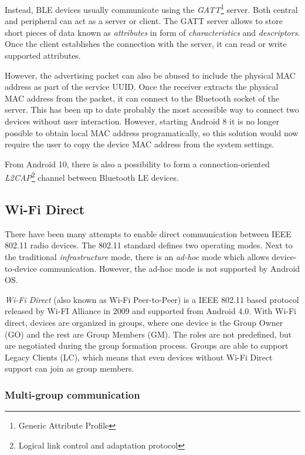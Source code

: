 \documentclass[conference,compsoc]{IEEEtran}
\begin{document}
Instead, BLE devices usually communicate using the \textit{GATT}\footnote{Generic Attribute Profile} server. Both central and peripheral can act as a server or client. The GATT server allows to store short pieces of data known as \textit{attributes} in form of \textit{characteristics} and \textit{descriptors}. Once the client establishes the connection with the server, it can read or write supported attributes.

However, the advertising packet can also be abused to include the physical MAC address as part of the service UUID. Once the receiver extracts the physical MAC address from the packet, it can connect to the Bluetooth socket of the server. This has been up to date probably the most accessible way to connect two devices without user interaction. However, starting Android 8 it is no longer possible to obtain local MAC address programatically, so this solution would now require the user to copy the device MAC address from the system settings.

From Android 10, there is also a possibility to form a connection-oriented \textit{L2CAP}\footnote{Logical link control and adaptation protocol} channel between Bluetooth LE devices.

\subsection{Wi-Fi Direct}

There have been many attempts to enable direct communication between IEEE 802.11 radio devices. The 802.11 standard defines two operating modes. Next to the traditional \textit{infrastructure} mode, there is an \textit{ad-hoc} mode which allows device-to-device communication. However, the ad-hoc mode is not supported by Android OS.

\textit{Wi-Fi Direct} (also known as Wi-Fi Peer-to-Peer) \cite{wifip2p} is a IEEE 802.11 based protocol released by Wi-FI Alliance in 2009 and supported from Android 4.0. With Wi-Fi direct, devices are organized in groups, where one device is the Group Owner (GO) and the rest are Group Members (GM). The roles are not predefined, but are negotiated during the group formation process. Groups are able to support Legacy Clients (LC), which means that even devices without Wi-Fi Direct support can join as group members.

\subsubsection{Multi-group communication}
\end{document}
